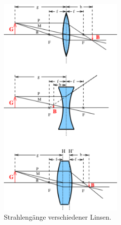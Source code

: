 \begin{figure}[hb]
	\centering
	\includegraphics[width=0.55\textwidth]{Bilder/Bildkonstruktionen.pdf}
	\caption{Strahlengänge verschiedener Linsen. \cite{skript}}
	\label{fig:strahlengaenge}
\end{figure}
